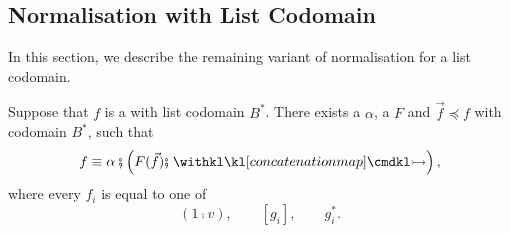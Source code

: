 \subsection{Normalisation with List Codomain}\label{sec:appendix:drops-with-list-co-domain}

In this section, we describe the remaining variant of  normalisation for a list codomain.

\begin{lemma}\label{lem:drops-with-list-co-domain}
	Suppose that $f$ is a  with list codomain $B^*$. There exists a  $\alpha$, a  $F$ and  $\vec f \preceq f$ with codomain $B^*$, such that 
	\[
		f \equiv \alpha \comp \left( F(\vec f) \comp \concmap \right),
	\]
	where every $f_i$ is equal to one of 
	\[
		(1 \comp v), \qquad [g_i], \qquad g_i^*.
	\]
\end{lemma}

